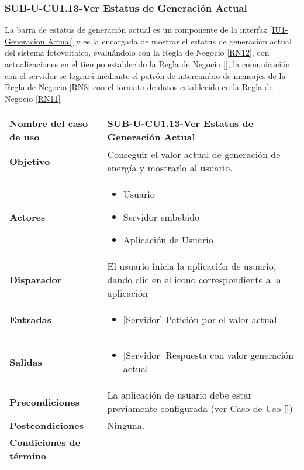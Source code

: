 \subsubsection{SUB-U-CU1.13-Ver Estatus de Generación Actual}\label{SUB-U-CU1.13}
La barra de estatus de generación actual es un componente de la interfaz  \hyperref[fig:monitoreo]{[IU1-Generacion Actual]}
y es la encargada de mostrar el estatus de generación actual del sistema fotovoltaico, evaluándolo con la Regla de Negocio \ref{RN12}, con actualizaciones en el tiempo establecido la Regla de Negocio \ref{}, la comunicación con el servidor se logrará mediante el patrón de intercambio de mensajes de la Regla de Negocio \ref{RN8} con el formato de datos establecido en la Regla de Negocio \ref{RN11}   

\begin{longtable}{|J{5cm}|J{10.3cm}|}
	\hline
	\textbf{Nombre del caso de uso} &
		SUB-U-CU1.13-Ver Estatus de Generación Actual \\ \hline
	\textbf{Objetivo} &
		Conseguir el valor actual de generación de energía y mostrarlo al usuario. \\ \hline
	\textbf{Actores} &
		\begin{itemize}
		    \item Usuario
			\item Servidor embebido
			\item Aplicación de Usuario
		\end{itemize} \\ \hline
	\textbf{Disparador} & 
	    El usuario inicia la aplicación de usuario, dando clic en el icono correspondiente a la aplicación\\ \hline 
	\textbf{Entradas} & 
		\begin{itemize}
				\item{[Servidor]} Petición por el valor actual
		\end{itemize}\\ \hline 
	\textbf{Salidas} & 
		\begin{itemize}
			\item{[Servidor]} Respuesta con valor generación actual
		\end{itemize} \\ \hline
	\textbf{Precondiciones} &
		La aplicación de usuario debe estar previamente configurada (ver Caso de Uso \ref{}) \\ \hline
	\textbf{Postcondiciones} &
		Ninguna.\\ \hline
	\textbf{Condiciones de término} & 
		\begin{itemize}

\end{itemize}
\end{longtable}
